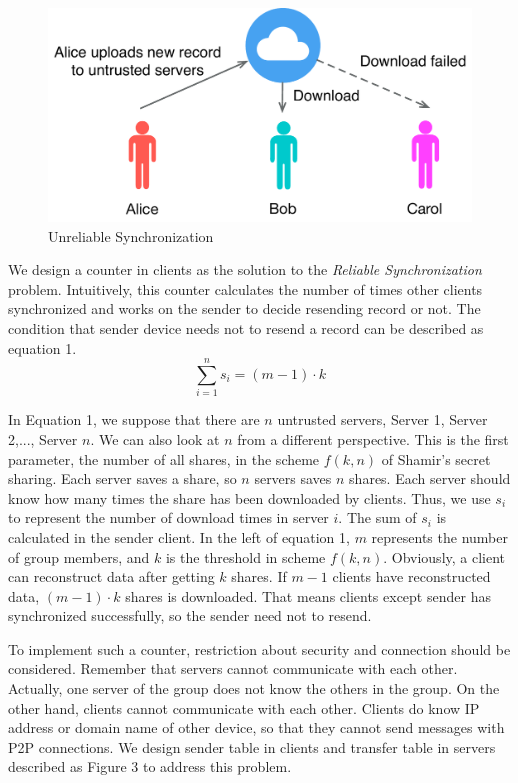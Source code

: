 \documentclass[twocolumn,10pt]{article}
\begin{document}
\begin{figure}[t]
	\centering
	\includegraphics[scale=0.35]{unreliabe_sync}
	\caption{Unreliable Synchronization}
\end{figure}

We design a counter in clients as the solution to the \emph{Reliable Synchronization} problem. Intuitively, this counter calculates the number of times other clients synchronized and works on the sender to decide resending record or not. The condition that sender device needs not to resend a record can be described as equation 1.
\begin{equation}
\sum_{i=1}^{n}s_{i}=(m-1)\cdot k
\end{equation}

In Equation 1, we suppose that there are $n$ untrusted servers, Server 1, Server 2,..., Server $n$. We can also look at $n$ from a different perspective. This is the first parameter, the number of all shares, in the scheme $f(k, n)$ of Shamir's secret sharing. Each server saves a share, so $n$ servers saves $n$ shares. Each server should know how many times the share has been downloaded by clients. Thus, we use $s_i$ to represent the number of download times in server $i$. The sum of $s_i$ is calculated in the sender client. In the left of equation 1, $m$ represents the number of group members, and $k$ is the threshold in scheme $f(k, n)$. Obviously, a client can reconstruct data after getting $k$ shares. If $m-1$ clients have reconstructed data, $(m-1)\cdot k$ shares is downloaded. That means clients except sender has synchronized successfully, so the sender need not to resend.

To implement such a counter, restriction about security and connection should be considered. Remember that servers cannot communicate with each other. Actually, one server of the group does not know the others in the group. On the other hand, clients cannot communicate with each other. Clients do know IP address or domain name of other device, so that they cannot send messages with P2P connections. We design sender table in clients and transfer table in servers described as Figure 3 to address this problem. 
\end{document}
